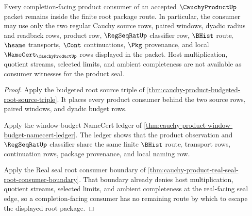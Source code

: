 \begin{theorem}
\label{thm:cauchy-product-root-completion-nonescape}
Every completion-facing product consumer of an accepted $\CauchyProductUp$ packet remains inside the finite root package route. In particular, the consumer may use only the two regular Cauchy source rows, paired windows, dyadic radius and readback rows, product row, $\RegSeqRatUp$ classifier row, $\BHist$ route, $\hsame$ transports, $\Cont$ continuations, $\Pkg$ provenance, and local $\NameCert_{\CauchyProductUp}$ rows displayed in the packet. Host multiplication, quotient streams, selected limits, and ambient completeness are not available as consumer witnesses for the product seal.
\end{theorem}
\begin{proof}
Apply the budgeted root source triple of \autoref{thm:cauchy-product-budgeted-root-source-triple}. It places every product consumer behind the two source rows, paired windows, and dyadic budget rows.

Apply the window-budget NameCert ledger of \autoref{thm:cauchy-product-window-budget-namecert-ledger}. The ledger shows that the product observation and $\RegSeqRatUp$ classifier share the same finite $\BHist$ route, transport rows, continuation rows, package provenance, and local naming row.

Apply the Real seal root consumer boundary of \autoref{thm:cauchy-product-real-seal-root-consumer-boundary}. That boundary already denies host multiplication, quotient streams, selected limits, and ambient completeness at the real-facing seal edge, so a completion-facing consumer has no remaining route by which to escape the displayed root package.
\end{proof}

